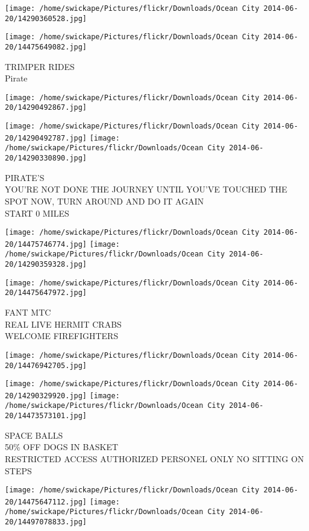 \documentclass[10pt,letterpaper]{article}
\begin{document}
\texttt{[image: /home/swickape/Pictures/flickr/Downloads/Ocean City 2014-06-20/14290360528.jpg]}

\vspace{0.25in}
\texttt{[image: /home/swickape/Pictures/flickr/Downloads/Ocean City 2014-06-20/14475649082.jpg]}

TRIMPER RIDES\\
Pirate
\pagebreak

\texttt{[image: /home/swickape/Pictures/flickr/Downloads/Ocean City 2014-06-20/14290492867.jpg]}

\vspace{0.25in}
\texttt{[image: /home/swickape/Pictures/flickr/Downloads/Ocean City 2014-06-20/14290492787.jpg]}
\texttt{[image: /home/swickape/Pictures/flickr/Downloads/Ocean City 2014-06-20/14290330890.jpg]}

PIRATE'S\\
YOU'RE NOT DONE THE JOURNEY UNTIL YOU'VE TOUCHED THE SPOT NOW, TURN AROUND AND DO IT AGAIN\\
START 0 MILES
\pagebreak

\texttt{[image: /home/swickape/Pictures/flickr/Downloads/Ocean City 2014-06-20/14475746774.jpg]}
\texttt{[image: /home/swickape/Pictures/flickr/Downloads/Ocean City 2014-06-20/14290359328.jpg]}

\texttt{[image: /home/swickape/Pictures/flickr/Downloads/Ocean City 2014-06-20/14475647972.jpg]}

FANT MTC\\
REAL LIVE HERMIT CRABS\\
WELCOME FIREFIGHTERS
\pagebreak

\texttt{[image: /home/swickape/Pictures/flickr/Downloads/Ocean City 2014-06-20/14476942705.jpg]}

\vspace{0.25in}
\texttt{[image: /home/swickape/Pictures/flickr/Downloads/Ocean City 2014-06-20/14290329920.jpg]}
\texttt{[image: /home/swickape/Pictures/flickr/Downloads/Ocean City 2014-06-20/14473573101.jpg]}

SPACE BALLS\\
50\% OFF DOGS IN BASKET\\
RESTRICTED ACCESS AUTHORIZED PERSONEL ONLY NO SITTING ON STEPS
\pagebreak

\texttt{[image: /home/swickape/Pictures/flickr/Downloads/Ocean City 2014-06-20/14475647112.jpg]}
\texttt{[image: /home/swickape/Pictures/flickr/Downloads/Ocean City 2014-06-20/14497078833.jpg]}
\end{document}
